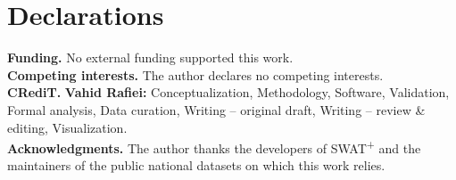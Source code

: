 \section*{Declarations}
\textbf{Funding.} No external funding supported this work.\\
\textbf{Competing interests.} The author declares no competing interests.\\
\textbf{CRediT.} \textbf{Vahid Rafiei:} Conceptualization, Methodology, Software, Validation, Formal analysis, Data curation, Writing -- original draft, Writing -- review \& editing, Visualization.\\
\textbf{Acknowledgments.} The author thanks the developers of SWAT\textsuperscript{+} and the maintainers of the public national datasets on which this work relies.
